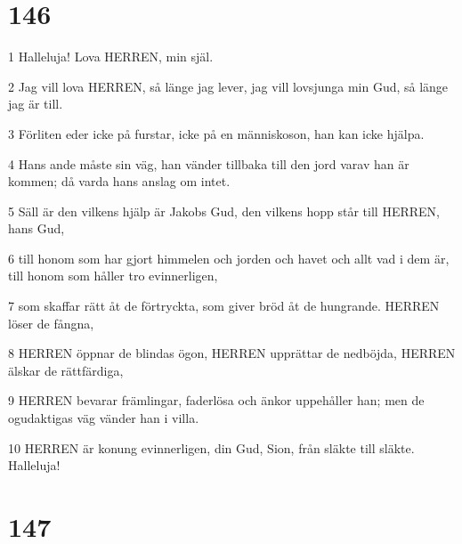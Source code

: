\chapter{146}

\par 1 Halleluja! Lova HERREN, min själ.
\par 2 Jag vill lova HERREN, så länge jag lever, jag vill lovsjunga min Gud, så länge jag är till.
\par 3 Förliten eder icke på furstar, icke på en människoson, han kan icke hjälpa.
\par 4 Hans ande måste sin väg, han vänder tillbaka till den jord varav han är kommen; då varda hans anslag om intet.
\par 5 Säll är den vilkens hjälp är Jakobs Gud, den vilkens hopp står till HERREN, hans Gud,
\par 6 till honom som har gjort himmelen och jorden och havet och allt vad i dem är, till honom som håller tro evinnerligen,
\par 7 som skaffar rätt åt de förtryckta, som giver bröd åt de hungrande. HERREN löser de fångna,
\par 8 HERREN öppnar de blindas ögon, HERREN upprättar de nedböjda, HERREN älskar de rättfärdiga,
\par 9 HERREN bevarar främlingar, faderlösa och änkor uppehåller han; men de ogudaktigas väg vänder han i villa.
\par 10 HERREN är konung evinnerligen, din Gud, Sion, från släkte till släkte. Halleluja!

\chapter{147}

